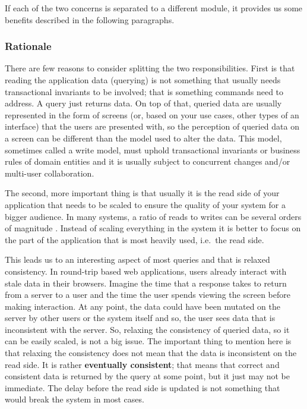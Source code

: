 \documentclass{book}
\begin{document}
If each of the two concerns is separated to a different module, it
provides us some benefits described in the following paragraphs.

\subsubsection{Rationale}\label{rationale}

There are few reasons to consider splitting the two responsibilities.
First is that reading the application data (querying) is not something
that usually needs transactional invariants to be involved; that is
something commands need to address. A query just returns data. On top of
that, queried data are usually represented in the form of screens (or,
based on your use cases, other types of an interface) that the users are
presented with, so the perception of queried data on a screen can be
different than the model used to alter the data. This model, sometimes
called a write model, must uphold transactional invariants or business
rules of domain entities and it is usually subject to concurrent changes
and/or multi-user collaboration.

The second, more important thing is that usually it is the read side of
your application that needs to be scaled to ensure the quality of your
system for a bigger audience. In many systems, a ratio of reads to
writes can be several orders of magnitude \cite{cap}. Instead of scaling
everything in the system it is better to focus on the part of the
application that is most heavily used, i.e.~the read side.

This leads us to an interesting aspect of most queries and that is
relaxed consistency. In round-trip based web applications, users already
interact with stale data in their browsers. Imagine the time that a
response takes to return from a server to a user and the time the user
spends viewing the screen before making interaction. At any point, the
data could have been mutated on the server by other users or the system
itself and so, the user sees data that is inconsistent with the server.
So, relaxing the consistency of queried data, so it can be easily
scaled, is not a big issue. The important thing to mention here is that
relaxing the consistency does not mean that the data is inconsistent on
the read side. It is rather \textbf{eventually consistent}; that means
that correct and consistent data is returned by the query at some point,
but it just may not be immediate. The delay before the read side is
updated is not something that would break the system in most cases.
\end{document}
